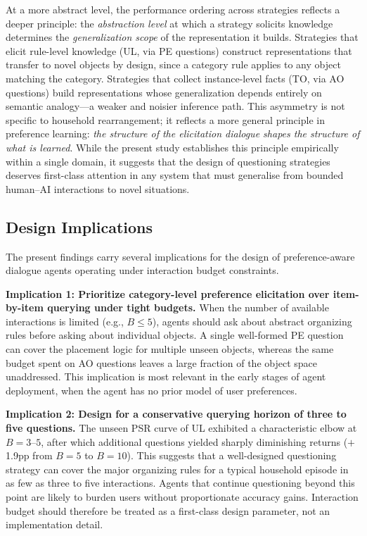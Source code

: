 \documentclass[manuscript,review,anonymous]{acmart}
\begin{document}
{At a more abstract level, the performance ordering across strategies reflects a deeper principle: the \textit{abstraction level} at which a strategy solicits knowledge determines the \textit{generalization scope} of the representation it builds. Strategies that elicit rule-level knowledge (UL, via PE questions) construct representations that transfer to novel objects by design, since a category rule applies to any object matching the category. Strategies that collect instance-level facts (TO, via AO questions) build representations whose generalization depends entirely on semantic analogy---a weaker and noisier inference path. This asymmetry is not specific to household rearrangement; it reflects a more general principle in preference learning: \textit{the structure of the elicitation dialogue shapes the structure of what is learned}. While the present study establishes this principle empirically within a single domain, it suggests that the design of questioning strategies deserves first-class attention in any system that must generalise from bounded human--AI interactions to novel situations.

\subsection{Design Implications}

The present findings carry several implications for the design of preference-aware dialogue agents operating under interaction budget constraints.

\textbf{Implication 1: Prioritize category-level preference elicitation over item-by-item querying under tight budgets.} When the number of available interactions is limited (e.g., $B \leq 5$), agents should ask about abstract organizing rules before asking about individual objects. A single well-formed PE question can cover the placement logic for multiple unseen objects, whereas the same budget spent on AO questions leaves a large fraction of the object space unaddressed. This implication is most relevant in the early stages of agent deployment, when the agent has no prior model of user preferences.

\textbf{Implication 2: Design for a conservative querying horizon of three to five questions.} The unseen PSR curve of UL exhibited a characteristic elbow at $B=3$--$5$, after which additional questions yielded sharply diminishing returns ($+$1.9pp from $B=5$ to $B=10$). This suggests that a well-designed questioning strategy can cover the major organizing rules for a typical household episode in as few as three to five interactions. Agents that continue questioning beyond this point are likely to burden users without proportionate accuracy gains. Interaction budget should therefore be treated as a first-class design parameter, not an implementation detail.

}
\end{document}
